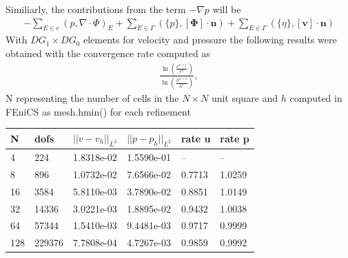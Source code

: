 Similiarly, the contributions from the term $-\nabla p$ will be
\begin{align}
	- \sum_{E \in e}(p, \nabla \cdot \Phi)_E + \sum_{E \in \Gamma}(\{p\},[\mathbf{\Phi}]\cdot \mathbf{n}) + \sum_{E \in \Gamma}(\{ \eta \},[\mathbf{v}]\cdot \mathbf{n})
\end{align}
With $DG_1\times DG_0$ elements for velocity and pressure the following results were obtained with the convergence rate computed as 
\begin{align}
\frac{\ln(\frac{e^{n+1}}{e^n})}{\ln(\frac{h^{n+1}}{h^n})},
\end{align}
N representing the number of cells in the $N\times N$ unit square and $h$ computed in FEniCS as mesh.hmin() for each refinement
\begin{table}[!h]
\begin{center}
  \begin{tabular}{|l | l | l | l| l| l|} \hline
	N & dofs & $||v-v_h||_{L^2}$&  $||p-p_h||_{L^2}$ & rate u & rate p\\ \hline
    4 & 224 & 1.8318e-02 & 1.5590e-01 & -- & --\\   \hline
    8 & 896 & 1.0732e-02 & 7.6566e-02 & 0.7713 & 1.0259 \\ \hline
    16 & 3584 & 5.8110e-03 & 3.7890e-02 & 0.8851 & 1.0149 \\ \hline
	32 & 14336 & 3.0221e-03 & 1.8895e-02 & 0.9432 & 1.0038 \\ \hline
	64 & 57344 & 1.5410e-03 & 9.4481e-03 & 0.9717 & 0.9999 \\ \hline
	128 & 229376 & 7.7808e-04 & 4.7267e-03 & 0.9859 & 0.9992 \\ \hline \hline
  \end{tabular}
\end{center}
\end{table}

